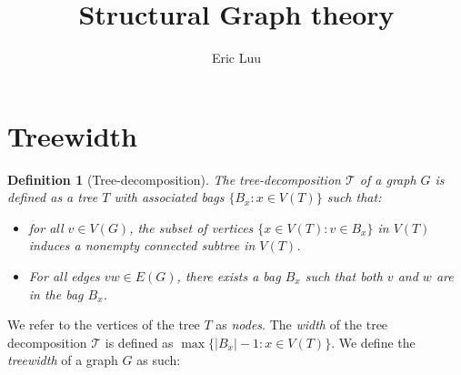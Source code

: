 \documentclass[]{article}
\title{Structural Graph theory}
\author{Eric Luu}
\newcommand{\tree}{\mathcal{T}}
\newtheorem{definition}[theorem]{Definition}
\theoremstyle{definition}
\numberwithin{theorem}{section}
\numberwithin{equation}{section}
\begin{document}
\maketitle

\section{Treewidth}

\begin{definition}[Tree-decomposition]
	The tree-decomposition $\tree$ of a graph $G$ is defined as a tree $T$ with associated \textit{bags} $\lbrace B_x : x \in V(T) \rbrace$ such that:
	\begin{itemize}
		\item for all $v \in V(G)$, the subset of vertices $\lbrace x \in V(T): v \in B_x \rbrace$ in $V(T)$ induces a nonempty connected subtree in $V(T)$.
		\item For all edges $vw \in E(G)$, there exists a bag $B_x$ such that both $v$ and $w$ are in the bag $B_x$.
	\end{itemize}
\end{definition}
We refer to the vertices of the tree $T$ as \textit{nodes}. 
The \textit{width} of the tree decomposition $\tree$ is defined as $\max \lbrace |B_x| - 1 : x \in V(T) \rbrace$. We define the \textit{treewidth} of a graph $G$ as such:
\end{document}

